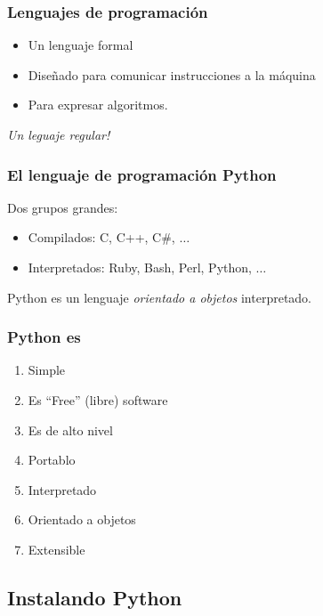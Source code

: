 \begin{frame}
\frametitle{Lenguajes de programaci\'on}
    \begin{itemize}
        \item Un lenguaje formal  \pause
        \item Dise\~nado para comunicar instrucciones a la m\'aquina \pause
        \item Para expresar algoritmos. \pause
    \end{itemize}
    \emph{ Un leguaje regular!}
\end{frame}

\begin{frame}
    \frametitle{El lenguaje de programaci\'on Python}
    Dos grupos grandes:
    \begin{itemize}
        \item Compilados: C, C++, C\#, $\ldots$
        \item Interpretados: Ruby, Bash, Perl, Python, $\ldots$
    \end{itemize}
    Python es un lenguaje \emph{orientado a objetos} interpretado.
\end{frame}



\begin{frame}
    \frametitle{Python es}
    \begin{enumerate}
        \item Simple
        \item Es ``Free'' (libre) software \pause
        \item Es de alto nivel \pause
        \item Portablo \pause
        \item Interpretado \pause
        \item Orientado a objetos \pause
        \item Extensible \pause
    \end{enumerate}
\end{frame}

\subsection{Instalando Python}

